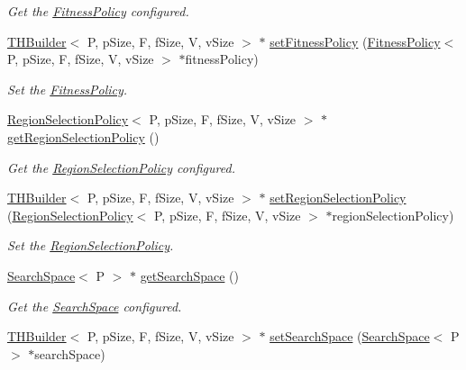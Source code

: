\begin{DoxyCompactItemize}
\begin{DoxyCompactList}\small\item\em Get the \hyperlink{classFitnessPolicy}{Fitness\+Policy} configured. \end{DoxyCompactList}\item 
\hyperlink{classTHBuilder}{T\+H\+Builder}$<$ P, p\+Size, F, f\+Size, V, v\+Size $>$ $\ast$ \hyperlink{classTHBuilder_a3db1fc6f43af80aac1ec2e6457477e48}{set\+Fitness\+Policy} (\hyperlink{classFitnessPolicy}{Fitness\+Policy}$<$ P, p\+Size, F, f\+Size, V, v\+Size $>$ $\ast$fitness\+Policy)
\begin{DoxyCompactList}\small\item\em Set the \hyperlink{classFitnessPolicy}{Fitness\+Policy}. \end{DoxyCompactList}\item 
\hyperlink{classRegionSelectionPolicy}{Region\+Selection\+Policy}$<$ P, p\+Size, F, f\+Size, V, v\+Size $>$ $\ast$ \hyperlink{classTHBuilder_a196903e0bccbc650cd8a965987756d28}{get\+Region\+Selection\+Policy} ()
\begin{DoxyCompactList}\small\item\em Get the \hyperlink{classRegionSelectionPolicy}{Region\+Selection\+Policy} configured. \end{DoxyCompactList}\item 
\hyperlink{classTHBuilder}{T\+H\+Builder}$<$ P, p\+Size, F, f\+Size, V, v\+Size $>$ $\ast$ \hyperlink{classTHBuilder_a802ae68e9ac5c333beefdd4c51d5ff26}{set\+Region\+Selection\+Policy} (\hyperlink{classRegionSelectionPolicy}{Region\+Selection\+Policy}$<$ P, p\+Size, F, f\+Size, V, v\+Size $>$ $\ast$region\+Selection\+Policy)
\begin{DoxyCompactList}\small\item\em Set the \hyperlink{classRegionSelectionPolicy}{Region\+Selection\+Policy}. \end{DoxyCompactList}\item 
\hyperlink{classSearchSpace}{Search\+Space}$<$ P $>$ $\ast$ \hyperlink{classTHBuilder_a611f5596ed334d38c1d77d57845676ed}{get\+Search\+Space} ()
\begin{DoxyCompactList}\small\item\em Get the \hyperlink{classSearchSpace}{Search\+Space} configured. \end{DoxyCompactList}\item 
\hyperlink{classTHBuilder}{T\+H\+Builder}$<$ P, p\+Size, F, f\+Size, V, v\+Size $>$ $\ast$ \hyperlink{classTHBuilder_ae0a7c1fca77f87c9d9e6bbad4c8f20be}{set\+Search\+Space} (\hyperlink{classSearchSpace}{Search\+Space}$<$ P $>$ $\ast$search\+Space)

\end{DoxyCompactItemize}
